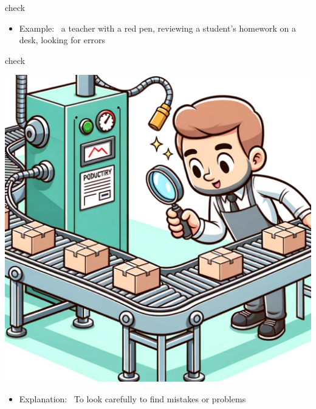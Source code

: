\documentclass[avery5371, grid,frame]{flashcards}
\begin{document}
\begin{flashcard}{check}
\begin{center}
\begin{minipage}[c]{.45\textwidth}
\begin{itemize}
            \item Example: \ a teacher with a red pen, reviewing a student's homework on a desk, looking for errors
            \end{itemize}
        \end{minipage}
    \end{center}
    \vspace*{\fill}
\end{flashcard}\begin{flashcard}{check}
    \vspace*{\fill}
    \begin{center}
        \begin{minipage}[c]{.45\textwidth}
            \includegraphics[width=\textwidth]{cards/c/check/check - a worker at a factory conveyor belt, inspecting products and ensuring their quality.png}
        \end{minipage}
        \begin{minipage}[c]{.45\textwidth}
            \begin{itemize}\setlength\itemsep{12pt}
            \item Explanation: \ To look carefully to find mistakes or problems


\end{itemize}
\end{minipage}
\end{center}
\end{flashcard}
\end{document}
